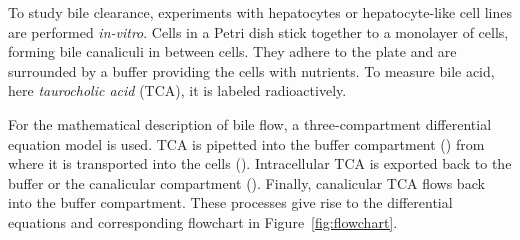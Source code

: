 \documentclass[article]{jss}
\begin{document}
To study bile clearance, experiments with hepatocytes or hepatocyte-like cell lines are performed \textit{in-vitro}. Cells in a Petri dish stick together to a monolayer of cells, forming bile canaliculi in between cells. They adhere to the plate and are surrounded by a buffer providing the cells with nutrients. To measure bile acid, here \textit{taurocholic acid} (TCA), it is labeled radioactively.

For the mathematical description of bile flow, a three-compartment differential equation model is used. TCA is pipetted into the buffer compartment () from where it is transported into the cells (). Intracellular TCA is exported back to the buffer or the canalicular compartment (). Finally, canalicular TCA flows back into the buffer compartment. These processes give rise to the differential equations and corresponding flowchart in Figure~\ref{fig:flowchart}.
\end{document}
